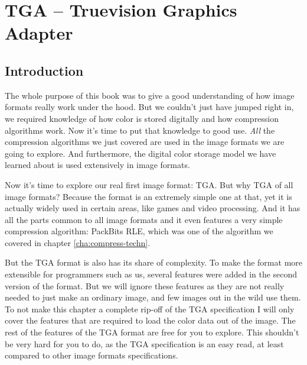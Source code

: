 \begin{comment}
  
\end{comment}

\chapter{TGA -- Truevision Graphics Adapter}
\label{cha:tga}

\begin{refsection}

  \section{Introduction}
  \label{sec:tga-introduction}

  The whole purpose of this book was to give a good understanding of
  how image formats really work under the hood. But we couldn't just
  have jumped right in, we required knowledge of how color is stored
  digitally and how compression algorithms work. Now it's time to put
  that knowledge to good use. \textit{All} the compression algorithms
  we just covered are used in the image formats we are going to
  explore. And furthermore, the digital color storage model we have
  learned about is used extensively in image formats.

  Now it's time to explore our real first image format:
  TGA. But why TGA of all image formats? Because the format
  is an extremely simple one at that, yet it is actually widely used
  in certain areas, like games and video processing. And it has all the
  parts common to all image formats and it even features a very simple
  compression algorithm: PackBits RLE, which was one of the algorithm we
  covered in chapter \ref{cha:compress-techn}.

  But the TGA format is also has its share of complexity. To make the
  format more extensible for programmers such as us, several features
  were added in the second version of the format. But we will ignore
  these features as they are not really needed to just make an
  ordinary image, and few images out in the wild use them. To not
  make this chapter a complete rip-off of the TGA specification
  \cite{91:_truev_tga_file_format_specif} I will only cover the
  features that are required to load the color data out of the
  image. The rest of the features of the TGA format are free for you
  to explore. This shouldn't be very hard for you to do, as the TGA
  specification is an easy read, at least compared to other image
  formats specifications.


\end{refsection}
